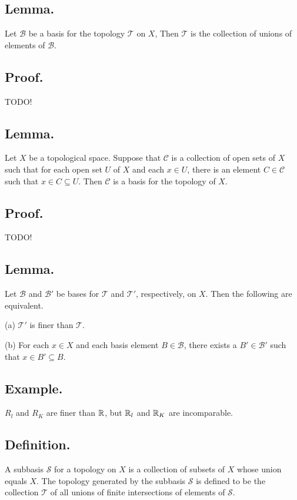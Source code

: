 \documentclass[titlepage]{article}
\begin{document}
\subsection{Lemma.} Let $\mathcal{B}$ be a basis for the topology $\mathcal{T}$ on $X$, Then $\mathcal{T}$ is the collection of unions of elements of $\mathcal{B}$.

\subsection{Proof.} TODO!

\subsection{Lemma.} Let $X$ be a topological space. Suppose that $\mathcal{C}$ is a collection of open sets of $X$ such that for each open set $U$ of $X$ and each $x \in U$, there is an element $C \in \mathcal{C}$ such that $x \in C \subseteq U$. Then $\mathcal{C}$ is a basis for the topology of $X$.

\subsection{Proof.} TODO!

\subsection{Lemma.} Let $\mathcal{B}$ and $\mathcal{B}'$ be bases for $\mathcal{T}$ and $\mathcal{T}'$, respectively, on $X$. Then the following are equivalent.

(a) $\mathcal{T}'$ is finer than $\mathcal{T}$.

(b) For each $x \in X$ and each basis element $B \in \mathcal{B}$, there exists a $B' \in \mathcal{B}'$ such that $x \in B' \subseteq B$.

\subsection{Example.} $R_{l}$ and $R_{K}$ are finer than $\mathbb{R}$, but $\mathbb{R}_{l}$ and $\mathbb{R}_{K}$ are incomparable.

\subsection{Definition.} A subbasis $\mathcal{S}$ for a topology on $X$ is a collection of subsets of $X$ whose union equals $X$. The topology generated by the subbasis $\mathcal{S}$ is defined to be the collection $\mathcal{T}$ of all unions of finite intersections of elements of $\mathcal{S}$.
\end{document}
